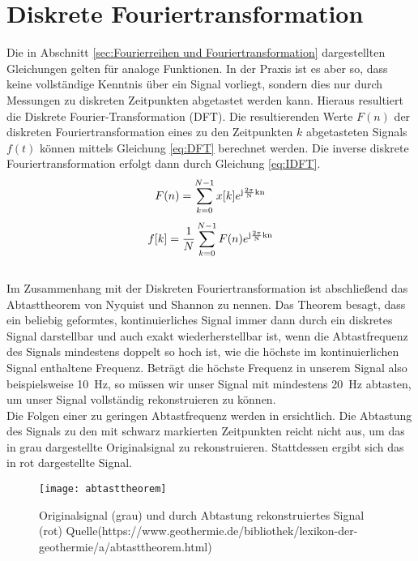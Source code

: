 \section{Diskrete Fouriertransformation}
\label{sec.Diskrete Fouriertransformation}
Die in Abschnitt \ref{sec:Fourierreihen und Fouriertransformation} dargestellten Gleichungen gelten für analoge Funktionen. In der Praxis ist es aber so, dass keine vollständige Kenntnis über ein Signal vorliegt, sondern dies nur durch Messungen zu diskreten Zeitpunkten abgetastet werden kann. Hieraus resultiert die Diskrete Fourier-Transformation (DFT). Die resultierenden Werte $F(n)$ der diskreten Fouriertransformation eines zu den Zeitpunkten $k$ abgetasteten Signals $f(t)$ können mittels Gleichung \ref{eq:DFT} berechnet werden. Die inverse diskrete Fouriertransformation erfolgt dann durch Gleichung \ref{eq:IDFT}.
\begin{equation}
	\label{eq:DFT}
	F(n) = \sum_{k=0}^{N-1}x[k]e^{\mathrm{j\frac{2\pi}{N}kn}}
\end{equation}
\begin{equation}
	\label{eq:IDFT}
	f[k] = \frac{1}{N}\sum_{k=0}^{N-1}F(n)e^{\mathrm{j\frac{2\pi}{N}kn}}
\end{equation} \\
Im Zusammenhang mit der Diskreten Fouriertransformation ist abschließend das Abtasttheorem von Nyquist und Shannon zu nennen. Das Theorem besagt, dass ein beliebig geformtes, kontinuierliches Signal immer dann durch ein diskretes Signal darstellbar und auch exakt wiederherstellbar ist, wenn die Abtastfrequenz des Signals mindestens doppelt so hoch ist, wie die höchste im kontinuierlichen Signal enthaltene Frequenz. Beträgt die höchste Frequenz in unserem Signal also beispielsweise \SI{10}{\Hz}, so müssen wir unser Signal mit mindestens \SI{20}{\Hz} abtasten, um unser Signal vollständig rekonstruieren zu können. \\
Die Folgen einer zu geringen Abtastfrequenz werden in  ersichtlich. Die Abtastung des Signals zu den mit schwarz markierten Zeitpunkten reicht nicht aus, um das in grau dargestellte Originalsignal zu rekonstruieren. Stattdessen ergibt sich das in rot dargestellte Signal.
\begin{figure}[!ht]
	\begin{center}
		\texttt{[image: abtasttheorem]}
		\caption{Originalsignal (grau) und durch Abtastung rekonstruiertes Signal (rot) Quelle(https://www.geothermie.de/bibliothek/lexikon-der-geothermie/a/abtasttheorem.html)}
		\label{fig.Abtasttheorem}
	\end{center}
\end{figure}
